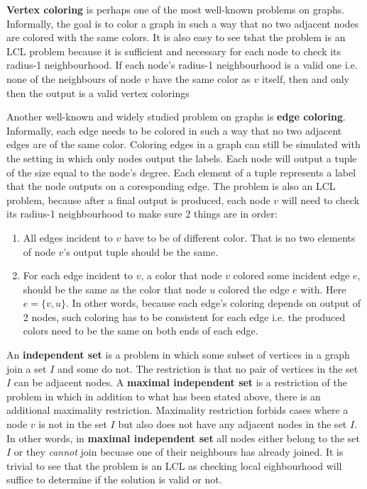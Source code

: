 \textbf{Vertex coloring} is perhaps one of the most well-known
problems on graphs. Informally, the goal is to color a graph
in such a way that no two adjacent nodes are colored with the
same colors. It is also easy to see tshat the problem is an
LCL problem because it is sufficient and necessary for each node to check
its radius-1 neighbourhood. If each node's radius-1 neighbourhood is
a valid one i.e. none of the neighbours of node $v$ have the same color as $v$
itself, then and only then the output is a valid vertex colorings

Another well-known and widely studied problem on graphs is
\textbf{edge coloring}. Informally, each edge needs to be
colored in such a way that no two adjacent edges are of the same
color. Coloring edges in a graph can still be simulated
with the setting in which only nodes output the labels.
Each node will output a tuple of the size equal to the node's
degree. Each element of a tuple represents a label
that the node outputs on a coresponding edge. The problem
is also an LCL problem, because after a final output is
produced, each node $v$ will need to check its radius-1
neighbourhood to make sure 2 things are in order:
\begin{enumerate}
  \item All edges incident to $v$ have to be of different color.
That is no two elements of node $v$'s output tuple should be the same.

  \item For each edge incident to $v$, a color that node $v$ colored some incident
edge $e$, should be the same as the color that node $u$ colored the edge $e$ with.
Here $e = \{v, u\}$. In other words, because each edge's coloring depends on
output of 2 nodes, such coloring has to be consistent for each edge i.e. the produced
colors need to be the same on both ends of each edge.
\end{enumerate}

An \textbf{independent set} is a problem in which some subset of vertices in a graph
join a set $I$ and some do not. The restriction is that no pair of vertices in the set $I$
can be adjacent nodes. A \textbf{maximal independent set} is a restriction of the
problem in which in addition to what has been stated above, there is an additional
maximality restriction. Maximality restriction forbids cases where a node $v$
is not in the set $I$ but also does not have any adjacent nodes in the set $I$.
In other words, in \textbf{maximal independent set} all nodes either belong
to the set $I$ or they \emph{cannot} join becuase one of their neighbours has
already joined. It is trivial to see that the problem is an LCL as checking local
eighbourhood will suffice to determine if the solution is valid or not.

